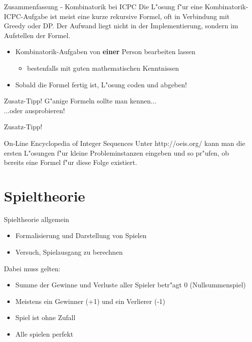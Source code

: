 \documentclass[18pt]{beamer}
\begin{document}
\begin{frame}{Zusammenfassung - Kombinatorik bei ICPC}
Die L"osung f"ur eine Kombinatorik-ICPC-Aufgabe ist meist eine kurze rekursive Formel, oft in Verbindung mit Greedy oder DP. Der Aufwand liegt nicht in der Implementierung, sondern im Aufstellen der Formel.
\begin{itemize}
\item Kombinatorik-Aufgaben von \textbf{einer} Person bearbeiten lassen

\begin{itemize}
\item bestenfalls mit guten mathematischen Kenntnissen
\end{itemize}

\item Sobald die Formel fertig ist, L"osung coden und abgeben!
\end{itemize}
\end{frame}

\begin{frame}{Zusatz-Tipp!}
G"anige Formeln sollte man kennen... \\
...oder ausprobieren! \\

\end{frame}

\begin{frame}{Zusatz-Tipp!}
\begin{block}{On-Line Encyclopedia of Integer Sequences}
Unter http://oeis.org/ kann man die ersten L"osungen f"ur kleine Probleminstanzen eingeben und so pr"ufen, ob bereits eine Formel f"ur diese Folge existiert.
\end{block}

\end{frame}

\section{Spieltheorie}
\begin{frame}{Spieltheorie allgemein}
\begin{itemize}
\item Formalisierung und Darstellung von Spielen
\item Versuch, Spielausgang zu berechnen
\end{itemize}
Dabei muss gelten:
\begin{itemize}
\item Summe der Gewinne und Verluste aller Spieler betr"agt 0 (Nullsummenspiel)
\item Meistens ein Gewinner (+1) und ein Verlierer (-1)
\item Spiel ist ohne Zufall
\item Alle spielen perfekt
\end{itemize}
\end{frame}
\end{document}
